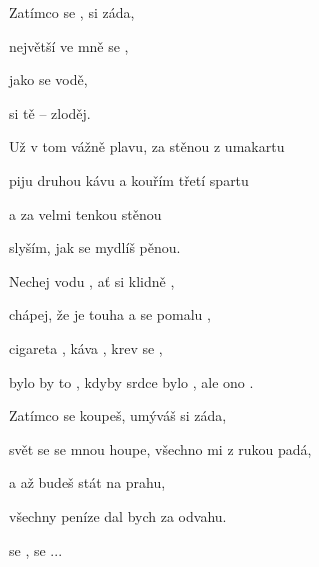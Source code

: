 

\zs
Zatímco se ,  si záda,

 největší  ve mně se ,

 jako se  vodě,

 si tě  -- zloděj.
\ks

\zs
Už v tom vážně plavu, za stěnou z umakartu

piju druhou kávu a kouřím třetí spartu

a za velmi tenkou stěnou

slyším, jak se mydlíš pěnou.
\ks

\zr
Nechej vodu ,  ať si klidně ,

chápej, že  je touha a  se pomalu ,

cigareta , káva , krev se ,

bylo by to , kdyby srdce bylo , ale ono .
\kr

\zs
Zatímco se koupeš, umýváš si záda,

svět se se mnou houpe, všechno mi z rukou padá,

a až budeš stát na prahu,

všechny peníze dal bych za odvahu.
\ks

\zr
{}se , se ...
\kr

\kp






